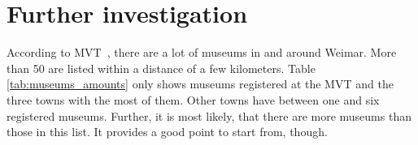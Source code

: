 %


\section{Further investigation}
\label{partnering_investigation}

According to \ac{MVT}~\cite{ThueringerMuseumsverbandOrte}, there are a lot of museums in and around Weimar. More than 50 are listed within a distance of a few kilometers. Table \ref{tab:museums_amounts} only shows museums registered at the \ac{MVT} and the three towns with the most of them. Other towns have between one and six registered museums. Further, it is most likely, that there are more museums than those in this list. It provides a good point to start from, though.

